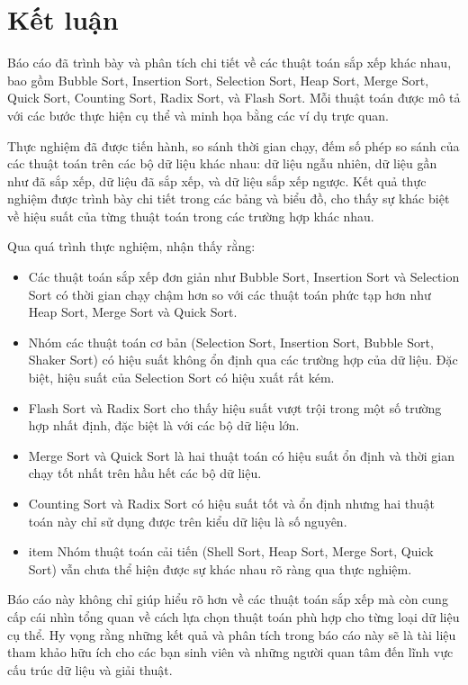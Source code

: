 \section{Kết luận}

Báo cáo đã trình bày và phân tích chi tiết về các thuật toán sắp xếp khác nhau, bao gồm Bubble Sort, Insertion Sort, Selection Sort, Heap Sort, Merge Sort, Quick Sort, Counting Sort, Radix Sort, và Flash Sort. Mỗi thuật toán được mô tả với các bước thực hiện cụ thể và minh họa bằng các ví dụ trực quan.

Thực nghiệm đã được tiến hành, so sánh thời gian chạy, đếm số phép so sánh của các thuật toán trên các bộ dữ liệu khác nhau: dữ liệu ngẫu nhiên, dữ liệu gần như đã sắp xếp, dữ liệu đã sắp xếp, và dữ liệu sắp xếp ngược. Kết quả thực nghiệm được trình bày chi tiết trong các bảng và biểu đồ, cho thấy sự khác biệt về hiệu suất của từng thuật toán trong các trường hợp khác nhau.

Qua quá trình thực nghiệm, nhận thấy rằng:
\begin{itemize}
    \item Các thuật toán sắp xếp đơn giản như Bubble Sort, Insertion Sort và Selection Sort có thời gian chạy chậm hơn so với các thuật toán phức tạp hơn như Heap Sort, Merge Sort và Quick Sort.
    \item Nhóm các thuật toán cơ bản (Selection Sort, Insertion Sort, Bubble Sort, Shaker Sort) có hiệu suất không ổn định qua các trường hợp của dữ liệu. Đặc biệt, hiệu suất của Selection Sort có hiệu xuất rất kém.
    \item Flash Sort và Radix Sort cho thấy hiệu suất vượt trội trong một số trường hợp nhất định, đặc biệt là với các bộ dữ liệu lớn.
    \item Merge Sort và Quick Sort là hai thuật toán có hiệu suất ổn định và thời gian chạy tốt nhất trên hầu hết các bộ dữ liệu.
    \item Counting Sort và Radix Sort có hiệu suất tốt và ổn định nhưng hai thuật toán này chỉ sử dụng được trên kiểu dữ liệu là số nguyên.
    \item item Nhóm thuật toán cải tiến (Shell Sort, Heap Sort, Merge Sort, Quick Sort) vẫn chưa thể hiện được sự khác nhau rõ ràng qua thực nghiệm.
\end{itemize}

Báo cáo này không chỉ giúp hiểu rõ hơn về các thuật toán sắp xếp mà còn cung cấp cái nhìn tổng quan về cách lựa chọn thuật toán phù hợp cho từng loại dữ liệu cụ thể. Hy vọng rằng những kết quả và phân tích trong báo cáo này sẽ là tài liệu tham khảo hữu ích cho các bạn sinh viên và những người quan tâm đến lĩnh vực cấu trúc dữ liệu và giải thuật.
